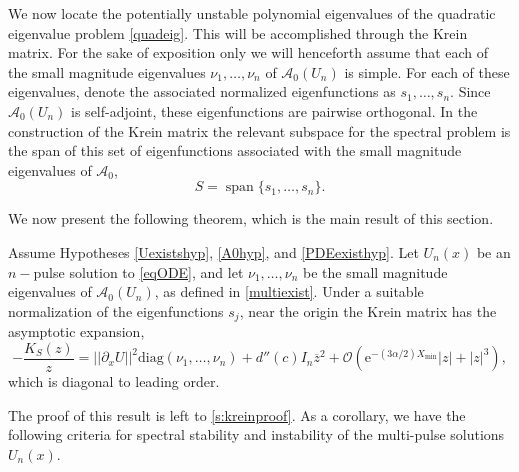 \documentclass[review,onefignum,onetabnum]{siamart171218}
\def\Span{\mathop\mathrm{span}\nolimits}
\newcommand{\rme}{\mathrm{e}}
\newcommand{\calA}{\mathcal{A}}
\newcommand{\vI}{\bm{\mathit{I}}}
\newcommand{\vK}{\bm{\mathit{K}}}
\begin{document}
We now locate the potentially unstable polynomial eigenvalues of the quadratic eigenvalue problem \cref{quadeig}. This will be accomplished through the Krein matrix. For the sake of exposition only we will henceforth assume that each of the small magnitude eigenvalues $\nu_1, \dots, \nu_n$ of $\calA_0(U_n)$ is simple. For each of these eigenvalues, denote the associated normalized eigenfunctions as $s_1, \dots, s_n$. Since $\calA_0(U_n)$ is self-adjoint, these eigenfunctions are pairwise orthogonal. In the construction of the Krein matrix the relevant subspace for the spectral problem is the span of this set of eigenfunctions associated with the small magnitude eigenvalues of $\calA_0$,
\begin{equation}\label{defS}
S = \Span\{s_1, \dots, s_n \}.
\end{equation}

We now present the following theorem, which is the main result of this section.

\begin{theorem}\label{Kreindiag}
Assume Hypotheses \ref{Uexistshyp}, \ref{A0hyp}, and \ref{PDEexisthyp}. Let $U_n(x)$ be an $n-$pulse solution to \cref{eqODE}, and let $\nu_1, \dots, \nu_n$ be the small magnitude eigenvalues of $\calA_0(U_n)$, as defined in \cref{multiexist}. Under a suitable normalization of the eigenfunctions $s_j$, near the origin the Krein matrix has the asymptotic expansion,
\begin{equation}\label{Kreinapprox}
-\frac{\vK_S(z)}{z} = ||\partial_xU||^2 \mathrm{diag} (\nu_1, \dots, \nu_n)
 + d''(c)\vI_n\overline{z}^2 + \mathcal{O}(\rme^{-(3 \alpha/2) X_{\mathrm{min}}}|z| + |z|^3),
\end{equation}
which is diagonal to leading order.
\end{theorem}

The proof of this result is left to \cref{s:kreinproof}. As a corollary, we have the following criteria for spectral stability and instability of the multi-pulse solutions $U_n(x)$.
\end{document}

